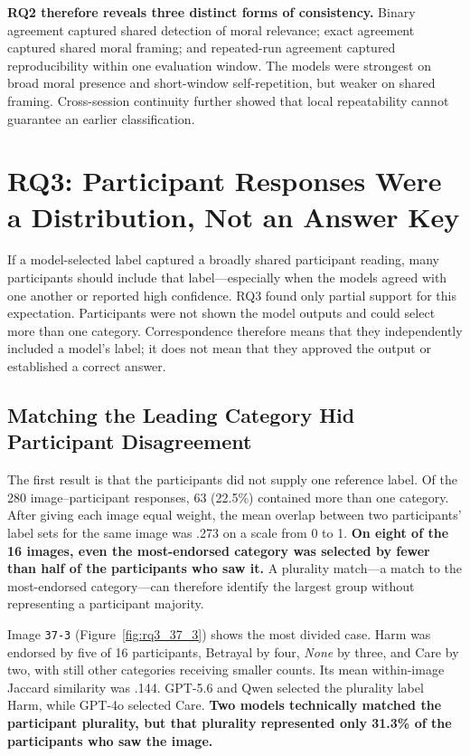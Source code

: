 \textbf{RQ2 therefore reveals three distinct forms of consistency.} Binary
agreement captured shared detection of moral relevance; exact agreement
captured shared moral framing; and repeated-run agreement captured
reproducibility within one evaluation window. The models were strongest on
broad moral presence and short-window self-repetition, but weaker on shared
framing. Cross-session continuity further showed that local repeatability
cannot guarantee an earlier classification.


\FloatBarrier
\section{RQ3: Participant Responses Were a Distribution, Not an Answer Key}
\label{sec:rq3_results}

If a model-selected label captured a broadly shared participant reading, many
participants should include that label---especially when the models agreed
with one another or reported high confidence. RQ3 found only partial support
for this expectation. Participants were not shown the model
outputs and could select more than one category. Correspondence therefore
means that they independently included a model's label; it does not mean that
they approved the output or established a correct answer.

\subsection{Matching the Leading Category Hid Participant Disagreement}

The first result is that the participants did not supply one reference
label. Of the 280 image--participant responses, 63 (22.5\%) contained more than
one category. After giving each image equal weight, the mean overlap between
two participants' label sets for the same image was .273 on a scale from 0 to
1. \textbf{On eight of the 16 images,
even the most-endorsed category was selected by fewer than half of the
participants who saw it.} A plurality match---a match to the most-endorsed
category---can therefore identify the largest group without representing a
participant majority.

Image \texttt{37-3} (Figure~\ref{fig:rq3_37_3}) shows the most divided case.
Harm was endorsed by five of 16 participants, Betrayal by four,
\textit{None} by three, and Care by two, with still other categories receiving
smaller counts. Its mean within-image Jaccard similarity was .144. GPT-5.6 and
Qwen selected the plurality label Harm, while GPT-4o selected Care.
\textbf{Two models technically matched the participant plurality, but that
plurality represented only 31.3\% of the participants who saw the image.}

